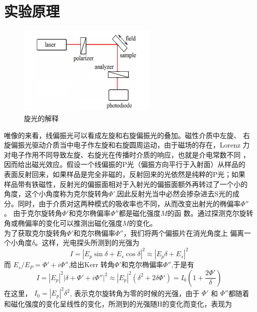 \documentclass[a4paper]{article}
\begin{document}
\section{实验原理}
\begin{figure}[!h]
    \centering
    \includegraphics[width=0.6\textwidth]{fig/fig1.png}
    \caption{旋光的解释}\label{fig1}
\end{figure}
唯像的来看，线偏振光可以看成左旋和右旋偏振光的叠加。磁性介质中左旋、
右旋偏振光驱动介质当中电子作左旋和右旋圆周运动，由于磁场的存在，Lorenz
力对电子作用不同导致左旋、右旋光在传播时介质的响应，也就是介电常数不同 ，
因而给出磁光效应。假设一个线偏振的P光（偏振方向平行于入射面）从样品的
表面反射回来，如果样品是完全非磁的，反射回来的光依然是纯粹的P光；如果
样品带有铁磁性，反射光的偏振面相对于入射光的偏振面额外再转过了一个小的
角度，这个小角度称为克尔旋转角$\varPhi '$,因此反射光当中必然会掺杂进去S光的成
分。同时，由于介质对这两种模式的吸收率也不同，从而改变出射光的椭偏率$\varPhi ''$。
由于克尔旋转角$\varPhi '$和克尔椭偏率$\varPhi ''$都是磁化强度$M$的函
数。通过探测克尔旋转角或椭偏率的变化可以推测出磁化强度$M$的变化。 \\
为了获取克尔旋转角$\varPhi '$和克尔椭偏率$\varPhi ''$，我们将两个偏振片在消光角度上
偏离一个小角度$\delta$。这样，光电探头所测到的光强为
\begin{equation}
    I=\left\lvert E_p \sin \delta +E_s\cos \delta \right\rvert ^2 \approx \left\lvert E_p \delta +E_s \right\rvert ^2 
\end{equation}
而 $E_s /E_P = \varPhi ' +i \varPhi ''$,给出Kerr 转角$\varPhi '$和克尔椭偏率$\varPhi ''$,于是有
\begin{equation}
    I = \left\lvert E_p \right\rvert ^2\left\lvert \delta + \varPhi ' +i \varPhi '' \right\rvert ^2 
    \approx  \left\lvert E_p \right\rvert ^2 (\delta ^2 + 2\delta \varPhi ')=I_0(1+\frac{2\varPhi '}{\delta})
\end{equation}
在这里， $I_0=\left\lvert E_p \right\rvert ^2 \delta ^2$, 表示克尔旋转角为零的时候的光强，由于 $\varPhi '$
和 $\varPhi ''$都随着和磁化强度的变化呈线性的变化，所测到的光强随H的变化而变化，表现为
\end{document}
